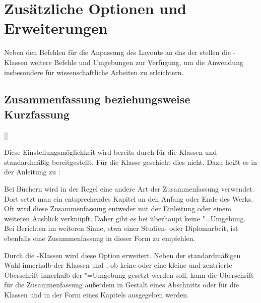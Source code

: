 \documentclass[%
  english,ngerman,%
  headings=optiontoheadandtoc,captions=tableheading,numbers=noenddot,%
  chapterpage,cdfoot,%
]{tudscrman}
\begin{document}
\section{Zusätzliche Optionen und Erweiterungen}
Neben den Befehlen für die Anpassung des Layouts an das \CD der \TnUD stellen 
die \TUDScript-Klassen weitere Befehle und Umgebungen zur Verfügung, um die 
Anwendung insbesondere für wissenschaftliche Arbeiten zu erleichtern.

\subsection{Zusammenfassung beziehungsweise Kurzfassung}
\begin{Declaration}{[\PSet]}%
\printdeclarationlist%
%
%

Diese Einstellungsmöglichkeit wird bereits durch \KOMAScript{} für die Klassen
 und  standardmäßig bereitgestellt. Für die
Klasse  geschieht dies nicht. Dazu heißt es in der Anleitung zu 
\KOMAScript{}:
%
\begin{quoting}
Bei Büchern wird in der Regel eine andere Art der Zusammenfassung verwendet. Dort
setzt man ein entsprechendes Kapitel an den Anfang oder Ende des Werks. Oft wird 
diese Zusammenfassung entweder mit der Einleitung oder einem weiteren Ausblick 
verknüpft. Daher gibt es bei  überhaupt keine 
"=Umgebung. Bei Berichten im weiteren Sinne, etwa einer 
Studien- oder Diplomarbeit, ist ebenfalls eine Zusammenfassung in dieser Form zu 
empfehlen.
\end{quoting}
%
Durch die \TUDScript-Klassen wird diese Option erweitert. Neben der 
standardmäßigen Wahl innerhalb der Klassen  und 
, ob keine oder eine kleine und zentrierte Überschrift 
innerhalb der "=Umgebung gesetzt werden soll, kann die 
Überschrift für die Zusammenfassung außerdem in Gestalt eines Abschnitts
oder für die Klassen  und  in der Form 
eines Kapitels ausgegeben werden.


\end{Declaration}
\end{document}
